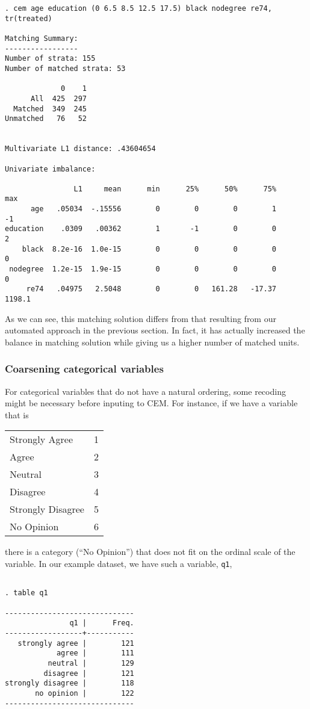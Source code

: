 \documentclass[11pt,titlepage]{article}
\begin{document}
\begin{verbatim}
. cem age education (0 6.5 8.5 12.5 17.5) black nodegree re74, tr(treated)

Matching Summary:
-----------------
Number of strata: 155
Number of matched strata: 53

             0    1
      All  425  297
  Matched  349  245
Unmatched   76   52


Multivariate L1 distance: .43604654

Univariate imbalance:

                L1     mean      min      25%      50%      75%      max
      age   .05034  -.15556        0        0        0        1       -1
education    .0309   .00362        1       -1        0        0        2
    black  8.2e-16  1.0e-15        0        0        0        0        0
 nodegree  1.2e-15  1.9e-15        0        0        0        0        0
     re74   .04975   2.5048        0        0   161.28   -17.37   1198.1

\end{verbatim}

As we can see, this matching solution differs from that resulting from our
automated approach in the previous section. In fact, it has actually
increased the balance in matching solution while giving us a higher number
of matched units.

\subsubsection{Coarsening categorical variables}

For categorical variables that do not have a natural ordering, some
recoding might be necessary before inputing to CEM. For instance, if we
have a variable that is

\begin{center}
\begin{tabular}{ll}
Strongly Agree    & 1\\
Agree   & 2\\
Neutral     & 3\\
Disagree         & 4\\
Strongly Disagree & 5\\
No Opinion      & 6 
\end{tabular}
\end{center}
there is a category (``No Opinion'') that does not fit on the ordinal
scale of the variable. In our example dataset, we have such a variable,
\texttt{q1},
\begin{verbatim}

. table q1

------------------------------
               q1 |      Freq.
------------------+-----------
   strongly agree |        121
            agree |        111
          neutral |        129
         disagree |        121
strongly disagree |        118
       no opinion |        122
------------------------------
\end{verbatim}
\end{document}
